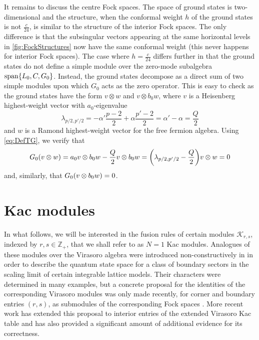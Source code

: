 \documentclass[a4paper,reqno,12pt]{report}
\theoremstyle{definition}
\numberwithin{equation}{section}
\let\originalleft\left     %
\let\originalright\right
\renewcommand{\left}{\mathopen{}\mathclose\bgroup\originalleft}
\renewcommand{\right}{\aftergroup\egroup\originalright}
\newcommand{\brac}[1]{\left( #1 \right)}
\newcommand{\set}[1]{\left\{ #1 \right\}}
\newcommand{\ZZ}{\mathbb{Z}}
\newcommand{\Kac}[1]{\mathcal{K}_{#1}}       %
\newcommand{\hw}{highest-weight}
\newcommand{\ssvs}{subsingular vectors}
\DeclareMathOperator{\vspn}{span}
\theoremstyle{plain}
\newcommand{\hwv}{\hw{} vector}
\begin{document}
It remains to discuss the centre Fock spaces.  The space of ground states is two-dimensional and the structure, when the conformal weight $h$ of the ground states is not $\frac{c}{24}$, is similar to the structure of the interior Fock spaces.  The only difference is that the \ssvs{} appearing at the same horizontal levels in \cref{fig:FockStructures} now have the same conformal weight (this never happens for interior Fock spaces).  The case where $h = \frac{c}{24}$ differs further in that the ground states do not define a simple module over the zero-mode subalgebra $\vspn \set{L_0, C, G_0}$.  Instead, the ground states decompose as a direct sum of two simple modules upon which $G_0$ acts as the zero operator.  This is easy to check as the ground states have the form $v \otimes w$ and $v \otimes b_0 w$, where $v$ is a Heisenberg \hwv{} with $a_0$-eigenvalue
\begin{equation}
\lambda_{p/2, p'/2} = -\alpha' \frac{p-2}{2} + \alpha \frac{p'-2}{2} = \alpha' - \alpha = \frac{Q}{2}
\end{equation}
and $w$ is a Ramond \hwv{} for the free fermion algebra.  Using \eqref{eq:DefTG}, we verify that
\begin{equation}
G_0 \brac{v \otimes w} = a_0 v \otimes b_0 w - \frac{Q}{2} v \otimes b_0 w = \brac{\lambda_{p/2,p'/2} - \frac{Q}{2}} v \otimes w = 0
\end{equation}
and, similarly, that $G_0 \brac{v \otimes b_0 w} = 0$.

\section{Kac modules} \label{sec:Kac}

In what follows, we will be interested in the fusion rules of certain modules $\Kac{r,s}$, indexed by $r,s \in \ZZ_+$, that we shall refer to as $N=1$ Kac modules.  Analogues of these modules over the Virasoro algebra were introduced non-constructively in \cite{PeaLog06,RasFus07,RasFus07b} in order to describe the quantum state space for a class of boundary sectors in the scaling limit of certain integrable lattice models.  Their characters were determined in many examples, but a concrete proposal for the identities of the corresponding Virasoro modules was only made recently, for corner and boundary entries $(r,s)$, as submodules of the corresponding Fock spaces \cite{RasCla11}.  More recent work \cite{MorKac15} has extended this proposal to interior entries of the extended Virasoro Kac table and has also provided a significant amount of additional evidence for its correctness.
\end{document}
